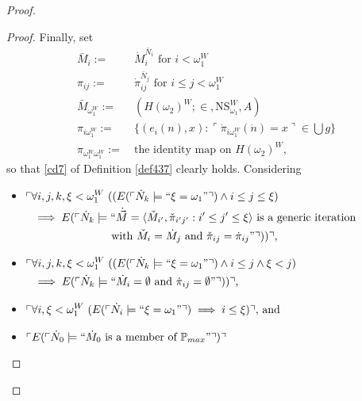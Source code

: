 \documentclass[12pt]{article}
\numberwithin{equation}{section}
\begin{document}
\begin{proof}
\begin{proof}
Finally, set
\begin{align*}
    \bar{M}_i := \ & \dot{M}_i^{\bar{N}_i} \text{ for } i < \omega_1^W \\
    \pi_{ij} := \ & \dot{\pi}_{ij}^{\bar{N}_j} \text{ for } i \leq j < \omega_1^W \\
    \bar{M}_{\omega_1^W} := \ & (H(\omega_2)^W; \in, \mathrm{NS}_{\omega_1}^W, A) \\
    \pi_{i\omega_1^W} := \ & \{(e_i(n), x) : \ulcorner \dot{\pi}_{i\omega_1^W}(\dot{n}) = x \urcorner \in \bigcup g\} \\
    \pi_{\omega_1^W\omega_1^W} := \ & \text{the identity map on } H(\omega_2)^W \text{,}
\end{align*}
so that \ref{cd7} of Definition \ref{def437} clearly holds. Considering 
\begin{itemize}
    \item
    \!
    $\begin{aligned}[t]
        \ulcorner & \forall i, j, k, \xi < \omega_1^W \ ((E(\ulcorner \dot{N}_k \models ``\xi = \omega_1" \urcorner) \wedge i \leq j \leq \xi) \\ 
        & \implies E(\ulcorner \dot{N}_{k} \models ``\dot{\Vec{M}} = \langle \check{M}_{i'}, \check{\pi}_{i'j'} : i' \leq j' \leq \xi \rangle \text{ is a generic iteration} \\
        & \mspace{130mu} \text{with } \check{M}_{i} = \dot{M}_j \text{ and } \check{\pi}_{ij} = \dot{\pi}_{ij}" \urcorner)) \urcorner \text{,}
    \end{aligned}$
    \item
    \!
    $\begin{aligned}[t]
        \ulcorner & \forall i, j, k, \xi < \omega_1^W \ ((E(\ulcorner \dot{N}_k \models ``\xi = \omega_1" \urcorner) \wedge i \leq j \wedge \xi < j) \\ 
        & \implies E(\ulcorner \dot{N}_{k} \models ``\dot{M}_i = \emptyset \text{ and } \dot{\pi}_{ij} = \emptyset" \urcorner)) \urcorner \text{,}
    \end{aligned}$
    \item 
    \!
    $\begin{aligned}[t]
        \ulcorner & \forall i, \xi < \omega_1^W \ (E(\ulcorner \dot{N}_i \models ``\xi = \omega_1" \urcorner) \implies i \leq \xi) \urcorner \text{, and}
    \end{aligned}$
    \item $\ulcorner E(\ulcorner \dot{N}_0 \models ``\dot{M}_0 \text{ is a member of } \mathbb{P}_{max}" \urcorner) \urcorner$

\end{itemize}
\end{proof}
\end{proof}
\end{document}
